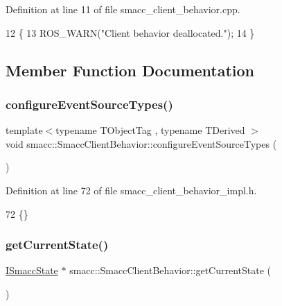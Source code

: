 Definition at line 11 of file smacc\+\_\+client\+\_\+behavior.\+cpp.


\begin{DoxyCode}
12 \{
13     ROS\_WARN(\textcolor{stringliteral}{"Client behavior deallocated."});
14 \}
\end{DoxyCode}


\subsection{Member Function Documentation}
\mbox{\label{classsmacc_1_1SmaccClientBehavior_a532a84b947599545a9955949c3b76648}} 
\subsubsection{\texorpdfstring{configure\+Event\+Source\+Types()}{configureEventSourceTypes()}}
{\footnotesize\ttfamily template$<$typename T\+Object\+Tag , typename T\+Derived $>$ \\
void smacc\+::\+Smacc\+Client\+Behavior\+::configure\+Event\+Source\+Types (\begin{DoxyParamCaption}{ }\end{DoxyParamCaption})\hspace{0.3cm}{\ttfamily [private]}}



Definition at line 72 of file smacc\+\_\+client\+\_\+behavior\+\_\+impl.\+h.


\begin{DoxyCode}
72 \{\}
\end{DoxyCode}
\mbox{\label{classsmacc_1_1SmaccClientBehavior_abf6773e4dd948f932f11a346dd6e7c2c}} 
\subsubsection{\texorpdfstring{get\+Current\+State()}{getCurrentState()}}
{\footnotesize\ttfamily \hyperlink{classsmacc_1_1ISmaccState}{I\+Smacc\+State} $\ast$ smacc\+::\+Smacc\+Client\+Behavior\+::get\+Current\+State (\begin{DoxyParamCaption}{ }\end{DoxyParamCaption})\hspace{0.3cm}{\ttfamily [inline]}}




